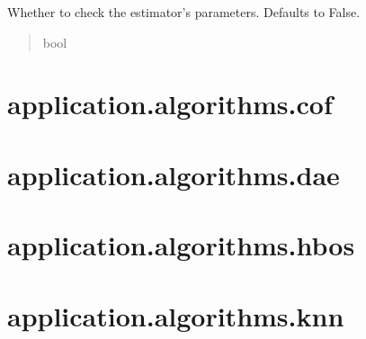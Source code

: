 \documentclass[letterpaper,10pt,english]{sphinxmanual}
\begin{document}
\begin{fulllineitems}
\begin{fulllineitems}
\begin{quote}
\begin{description}
\end{description}\end{quote}

\end{fulllineitems}


\begin{fulllineitems}
\label{\detokenize{modules:application.algorithms.cblof.CblofConfiguration.CblofConfiguration.check_estimator}}
\pysigstartsignatures
{}
\pysigstopsignatures
\sphinxAtStartPar
Whether to check the estimator’s parameters. Defaults to False.
\begin{quote}\begin{description}
\sphinxAtStartPar
bool

\end{description}\end{quote}

\end{fulllineitems}


\end{fulllineitems}



\section{application.algorithms.cof}
\label{\detokenize{modules:application-algorithms-cof}}

\section{application.algorithms.dae}
\label{\detokenize{modules:application-algorithms-dae}}

\section{application.algorithms.hbos}
\label{\detokenize{modules:application-algorithms-hbos}}

\section{application.algorithms.knn}
\label{\detokenize{modules:application-algorithms-knn}}
\end{document}
